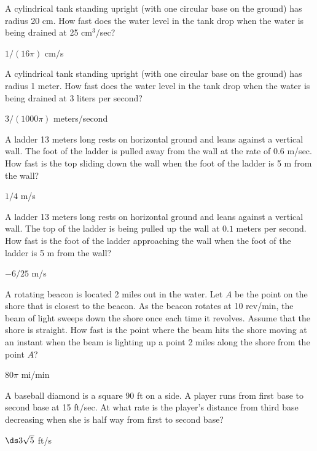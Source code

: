 \begin{exercises}

\exercise
A cylindrical tank standing upright (with one circular base on the
ground) has radius 20 cm.  How fast does the water level in the
tank drop when the water is being drained at 25 cm${}^3$/sec?
\begin{answer} $1/(16\pi)$ cm/s
\end{answer}

\exercise
A cylindrical tank standing upright (with one circular base on the
ground) has radius 1 meter.  How fast does the water level in the
tank drop when the water is being drained at 3 liters per second?
\begin{answer} $3/(1000\pi)$ meters/second
\end{answer}

\exercise A ladder 13 meters long rests on horizontal ground and leans
against a vertical wall.  The foot of the ladder is pulled away from
the wall at the rate of 0.6 m/sec.  How fast is the top sliding down
the wall when the foot of the ladder is 5 m from the wall?
\begin{answer} $1/4$ m/s
\end{answer}

\exercise A ladder 13 meters long rests on horizontal ground and leans
against a vertical wall. The top of the ladder is being pulled up the
wall at $0.1$ meters per second.
How fast is the foot of the ladder approaching 
the wall when the foot of the ladder is 5 m from the wall?
\begin{answer} $-6/25$ m/s
\end{answer}

\exercise
A rotating beacon is located 2 miles out in the water.  Let $A$ be the
point on the shore that is closest to the beacon.  As the beacon rotates at
10 rev/min, the beam of light sweeps down the shore once each time it revolves.
Assume that the shore is straight.  How fast is the point where the beam
hits the shore moving at an instant when the beam is lighting up a point 2
miles along the shore from the point $A$?
\begin{answer} $80\pi$ mi/min
\end{answer}

\exercise
A baseball diamond is a square 90 ft on a side.  A player runs from first
base to second base at 15 ft/sec.  At what rate is the player's distance
from third base decreasing when she is half way from first to second base?
\begin{answer} $\ds 3\sqrt5$ ft/s
\end{answer}


\end{exercises}

